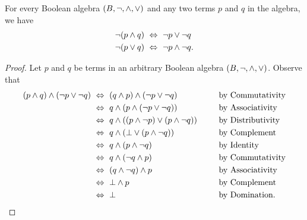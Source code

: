 \begin{theorem}
    For every Boolean algebra $(B, \neg, \wedge, \vee)$ and any two terms $p$ and $q$ in the algebra,
    we have
    \begin{align*}
        \neg (p \wedge q) &~\Leftrightarrow~ \neg p \vee \neg q\\
        \neg (p \vee q) &~\Leftrightarrow~ \neg p \wedge \neg q.
    \end{align*}
\end{theorem}
\begin{proof}
    Let $p$ and $q$ be terms in an arbitrary Boolean algebra $(B, \neg, \wedge, \vee)$.
    Observe that
    \begin{alignat*}{2}
        (p \meet q) \meet (\neg p \join \neg q) &\iff (q \meet p) \meet (\neg p \join \neg q)~~~~~~~~~~~~&&\text{by Commutativity}\\
                                                &\iff q \meet (p \meet (\neg p \join \neg q)) &&\text{by Associativity}\\
                                                &\iff q \meet \pn*{(p \meet \neg p) \join (p \meet \neg q)} &&\text{by Distributivity}\\
                                                &\iff q \meet (\bot \join (p \meet \neg q)) &&\text{by Complement}\\
                                                &\iff q \meet (p \meet \neg q) &&\text{by Identity}\\
                                                &\iff q \meet (\neg q \meet p) &&\text{by Commutativity}\\
                                                &\iff (q \meet \neg q) \meet p &&\text{by Associativity}\\
                                                &\iff \bot \meet p &&\text{by Complement}\\
                                                &\iff \bot &&\text{by Domination}.
    \end{alignat*}


\end{proof}
